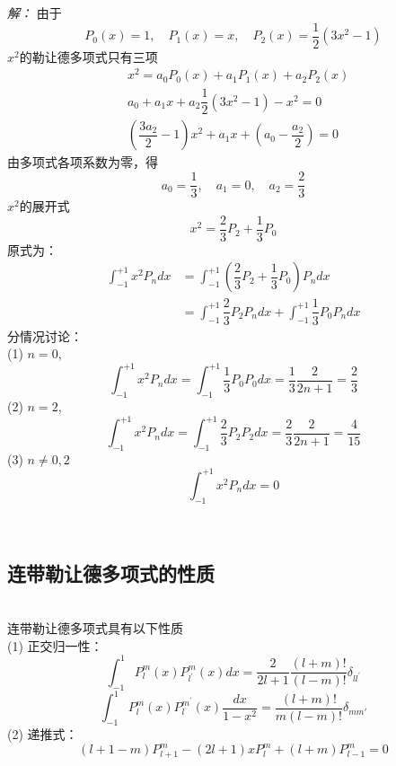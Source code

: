 	\emph{解：}
		由于
		\begin{equation*}
			P_0(x)=1, \quad	P_1(x)=x, \quad P_2(x)= \dfrac{1}{2}(3x^2-1)  
		\end{equation*}	
		$x^2$的勒让德多项式只有三项
		\[
			\begin{aligned}
				&x^2 = a_0P_0(x) + a_1P_1(x) + a_2P_2(x) \\
				&a_0 + a_1 x + a_2 \dfrac{1}{2}(3x^2-1) - x^2 =0 \\
				& ( \dfrac{3a_2}{2} -1)x^2 + a_1 x + (a_0 -\dfrac{a_2}{2} ) =0
			\end{aligned} 
		\]
		由多项式各项系数为零，得 
		\begin{equation*}
			a_0 =\dfrac{1}{3}, \quad	a_1 =0, \quad a_2 =\dfrac{2}{3}
		\end{equation*}	
		$x^2$的展开式
		$$ x^2 =\dfrac{2}{3}P_2+\dfrac{1}{3}P_0$$
		原式为：
		\begin{equation*}
		\begin{aligned}
			\int_{-1}^{+1} x^2 P _{n} dx &= \int_{-1}^{+1} (\dfrac{2}{3}P_2+\dfrac{1}{3}P_0)  P _{n} dx \\	  
			&= \int_{-1}^{+1} \dfrac{2}{3}P_2 P _{n} dx + \int_{-1}^{+1} \dfrac{1}{3}P_0 P _{n} dx
		\end{aligned}  	
		\end{equation*}	
		分情况讨论：\\
		(1)  $n=0$, 
		\begin{equation*}
			\int_{-1}^{+1} x^2 P _{n} dx  =   \int_{-1}^{+1} \dfrac{1}{3}P_0  P _{0} dx=\dfrac{1}{3} \frac{2}{2n+1}  = \dfrac{2}{3}	
		\end{equation*}	
		(2)  $n=2$, 
		\begin{equation*}
			\int_{-1}^{+1} x^2 P _{n} dx  =   \int_{-1}^{+1} \dfrac{2}{3}P_2  P _{2} dx= \dfrac{2}{3}\frac{2}{2n+1}  = \dfrac{4}{15}	
		\end{equation*}	
		(3) $ n\neq 0,2$
		\begin{equation*}
			\int_{-1}^{+1} x^2 P _{n} dx  =  0	
		\end{equation*}
	
	~~\\ 
	
	
	\subsection{连带勒让德多项式的性质}
	~\\
	连带勒让德多项式具有以下性质\\
	(1) 正交归一性：
	$$
	\int_{-1}^1 P_l^m(x) P_{l^{\prime}}^m(x) d x=\frac{2}{2 l+1} \frac{(l+m) !}{(l-m) !} \delta_{l l^{\prime}}
	$$
	$$
	\int_{-1}^1 P_l^m(x) P_l^{m^{\prime}}(x) \frac{d x}{1-x^2}=\frac{(l+m) !}{m(l-m) !} \delta _{mm'}
	$$	
	(2) 递推式： 
	\begin{equation*}
		(l+1-m)P^m _{l+1} -(2l+1)x P^m _l + (l+m) P^m _{l-1} =0 
	\end{equation*}	
	~~\\ 
	
